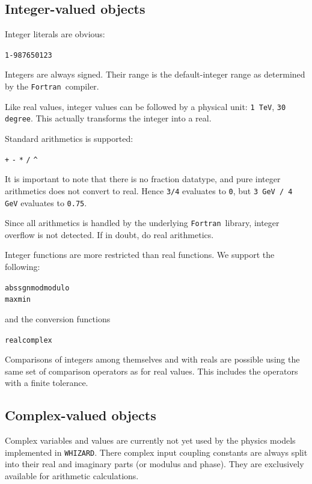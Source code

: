 \documentclass[12pt]{book}
\newcommand{\ttt}[1]{\texttt{#1}}
\newcommand{\whizard}{\ttt{WHIZARD}}
\newcommand{\fortran}{\ttt{Fortran}}
\begin{document}

\subsection{Integer-valued objects}
\label{sec:integer}

Integer literals are obvious:
\begin{center}
\ttt{1}\quad \ttt{-98765}\quad \ttt{0123}
\end{center}
Integers are always signed.  Their range is the default-integer range as
determined by the \fortran\ compiler.

Like real values, integer values can be followed by a physical unit: \ttt{1
  TeV}, \ttt{30 degree}.  This actually transforms the integer into a real.

Standard arithmetics is supported:
\begin{center}
  \verb|+| \verb|-| \verb|*| \verb|/| \verb|^|
\end{center}
It is important to note that there is no fraction datatype, and pure integer
arithmetics does not convert to real.  Hence \ttt{3/4} evaluates to \ttt{0},
but \ttt{3 GeV / 4 GeV} evaluates to \ttt{0.75}.

Since all arithmetics is handled by the underlying \fortran\ library, integer
overflow is not detected.  If in doubt, do real arithmetics.

Integer functions are more restricted than real functions.  We support the
following:
\begin{center}
  \ttt{abs}\quad \ttt{sgn}\quad \ttt{mod}\quad \ttt{modulo}
\\
  \ttt{max}\quad \ttt{min}
\end{center}
and the conversion functions
\begin{center}
  \ttt{real}\quad \ttt{complex}
\end{center}
Comparisons of integers among themselves and with reals are possible using the
same set of comparison operators as for real values.  This includes
the operators with a finite tolerance.


\subsection{Complex-valued objects}
\label{sec:complex}

Complex variables and values are currently not yet used by the physics
models implemented in \whizard. There complex input coupling constants
are always split into their real and imaginary parts (or modulus and
phase). They are exclusively available for arithmetic calculations.
\end{document}
